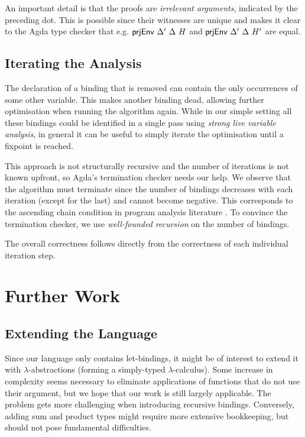 \documentclass[11pt,a4paper]{article}
\begin{document}
An important detail is that the \AgdaFunction{$\subseteq$} proofs
are \emph{irrelevant arguments}, indicated by the preceding dot.
This is possible since their witnesses are unique
and makes it clear to the Agda type checker that e.g.
$\AgdaFunction{prjEnv}\ \Delta'\ \Delta\ H$ and
$\AgdaFunction{prjEnv}\ \Delta'\ \Delta\ H'$ are equal.


\subsection{Iterating the Analysis}

The declaration of a binding that is removed
can contain the only occurrences of some other variable.
This makes another binding dead, allowing further optimisation when running the algorithm again.
While in our simple setting all these bindings could be identified in a single pass
using \emph{strong live variable analysis},
in general it can be useful to simply iterate the optimisation until a fixpoint is reached.

This approach is not structurally recursive and the number of iterations is not known upfront,
so Agda's termination checker needs our help.
We observe that the algorithm must terminate
since the number of bindings decreases with each iteration
(except for the last) and cannot become negative.
This corresponds to the ascending chain condition in program analysis literature
\cite{nielsen1999analysis}.
To convince the termination checker, we use \emph{well-founded recursion} \cite{bove2016recursion}
on the number of bindings.

The overall correctness follows directly from the correctness of each individual iteration step.


\section{Further Work}

\subsection{Extending the Language}

Since our language only contains let-bindings,
it might be of interest to extend it with $\lambda$-abstractions
(forming a simply-typed $\lambda$-calculus).
Some increase in complexity seems necessary to eliminate applications of
functions that do not use their argument,
but we hope that our work is still largely applicable.
The problem gets more challenging when introducing recursive bindings.
Conversely, adding sum and product types might require more extensive bookkeeping,
but should not pose fundamental difficulties.
\end{document}
